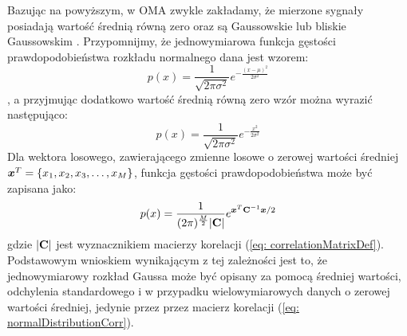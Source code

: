 Bazując na powyższym, w OMA zwykle zakładamy, że mierzone sygnały posiadają wartość średnią równą zero oraz są Gaussowskie  lub bliskie Gaussowskim \parencite{Brincker2015}. Przypomnijmy, że jednowymiarowa funkcja gęstości prawdopodobieństwa rozkładu normalnego dana jest wzorem:
\begin{equation}
	p(x) = \frac{1}{\sqrt{2\pi\sigma^2}}e^{-\frac{(x-\mu)^2}{2\sigma^2}}
\end{equation}
, a przyjmując dodatkowo wartość średnią równą
zero wzór można wyrazić następująco:
\begin{equation} \label{eq:normalDensZeroMean}
	p(x) = \frac{1}{\sqrt{2\pi\sigma^2}}e^{-\frac{x^2}{2\sigma^2}}
\end{equation}
Dla wektora losowego, zawierającego zmienne losowe o zerowej wartości średniej $\bm{x}^T=\{x_1,x_2,x_3,\hdots,x_M\}$, funkcja gęstości prawdopodobieństwa może być zapisana jako:
\begin{equation}\label{eq: normalDistributionCorr}
	p(x) = \frac{1}{(2\pi)^\frac{M}{2} \mathbf{|C|}}e^{\bm{x}^T\mathbf{C}^{-1}\bm{x}/2}
\end{equation}
gdzie $|\mathbf{C}|$ jest wyznacznikiem macierzy korelacji (\ref{eq: correlationMatrixDef}). Podstawowym wnioskiem wynikającym z tej zależności jest to, że jednowymiarowy rozkład Gaussa może być opisany za pomocą średniej wartości, odchylenia standardowego i w przypadku wielowymiarowych danych o zerowej wartości średniej, jedynie przez przez macierz korelacji (\ref{eq: normalDistributionCorr}).


